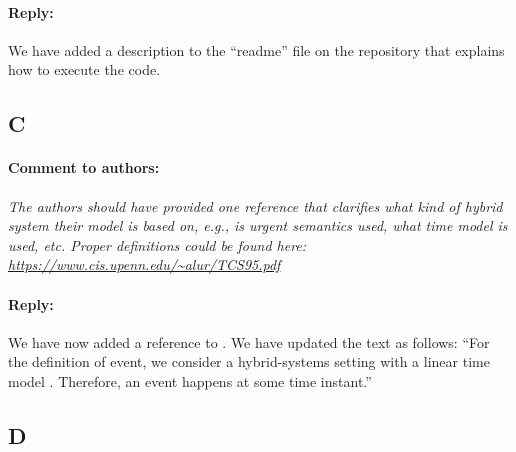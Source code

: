 \documentclass[10pt,final,a4paper,oneside,onecolumn]{article}
\newcommand{\toauthor}{\paragraph*{Comment to authors:} \itshape}
\newcommand{\fromauthor}{\paragraph*{Reply:} \normalfont}
\newcommand{\toauthornew}{\paragraph*{Comment to authors:} \itshape}
\newcommand{\fromauthornew}{\paragraph*{Reply:} \normalfont}
\newcommand{\cstart}{\cbstart\color{red}}
\newcommand{\cend}{\cbend\color{black}}
\begin{document}
\fromauthornew We have added a description to the ``readme'' file on the repository that explains how to execute the code.



\subsection*{C}

%

\toauthornew The authors should have provided one reference that clarifies what kind of hybrid system their model is based on, e.g., is urgent semantics used, what time model is used, etc. Proper definitions could be found here: \url{https://www.cis.upenn.edu/~alur/TCS95.pdf}

\fromauthornew 
We have now added a reference to \autocite{alur1994theory}. We have updated the text as follows:
``\cstart For the definition of event, we consider a hybrid-systems setting with a linear time model \autocite{alur1994theory}. Therefore, an event happens at some time instant.\cend''


\subsection*{D}

%
\end{document}
